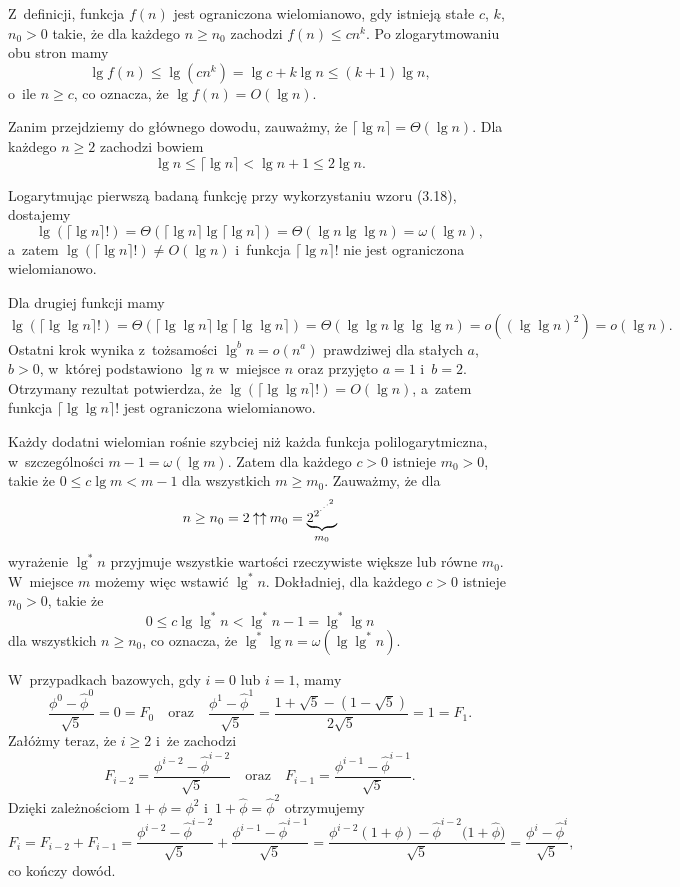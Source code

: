 \exercise %
Z~definicji, funkcja $f(n)$ jest ograniczona wielomianowo, gdy istnieją stałe $c$, $k$, $n_0>0$ takie, że dla każdego $n\ge n_0$ zachodzi $f(n)\le cn^k$.
Po zlogarytmowaniu obu stron mamy
\[
	\lg f(n) \le \lg(cn^k) = \lg c+k\lg n \le (k+1)\lg n,
\]
o~ile $n\ge c$, co oznacza, że $\lg f(n)=O(\lg n)$.

Zanim przejdziemy do głównego dowodu, zauważmy, że $\lceil\lg n\rceil=\Theta(\lg n)$.
Dla każdego $n\ge2$ zachodzi bowiem
\[
	\lg n \le \lceil\lg n\rceil < \lg n+1 \le 2\lg n.
\]

Logarytmując pierwszą badaną funkcję przy wykorzystaniu wzoru (3.18), dostajemy
\[
	\lg(\lceil\lg n\rceil!) = \Theta(\lceil\lg n\rceil\lg\lceil\lg n\rceil) = \Theta(\lg n\lg\lg n) = \omega(\lg n),
\]
a~zatem $\lg(\lceil\lg n\rceil!)\ne O(\lg n)$ i~funkcja $\lceil\lg n\rceil!$ nie jest ograniczona wielomianowo.

Dla drugiej funkcji mamy
\[
	\lg(\lceil\lg\lg n\rceil!) = \Theta(\lceil\lg\lg n\rceil\lg\lceil\lg\lg n\rceil) = \Theta(\lg\lg n\lg\lg\lg n) = o((\lg\lg n)^2) = o(\lg n).
\]
Ostatni krok wynika z~tożsamości $\lg^bn=o(n^a)$ prawdziwej dla stałych $a$, $b>0$, w~której podstawiono $\lg n$ w~miejsce $n$ oraz przyjęto $a=1$ i~$b=2$.
Otrzymany rezultat potwierdza, że $\lg(\lceil\lg\lg n\rceil!)=O(\lg n)$, a~zatem funkcja $\lceil\lg\lg n\rceil!$ jest ograniczona wielomianowo.

\exercise %
Każdy dodatni wielomian rośnie szybciej niż każda funkcja polilogarytmiczna, w~szczególności $m-1=\omega(\lg m)$.
Zatem dla każdego $c>0$ istnieje $m_0>0$, takie że $0\le c\lg m<m-1$ dla wszystkich $m\ge m_0$.
Zauważmy, że dla
\[
	\setlength{\abovedisplayskip}{2pt}
	\setlength{\belowdisplayskip}{2pt}
	n \ge n_0 = 2\mathbin{\uparrow\uparrow}m_0 = \underbrace{2^{2^{\cdot^{\cdot^{\cdot^{2}}}}}}_{m_0}
\]
wyrażenie $\lg^*n$ przyjmuje wszystkie wartości rzeczywiste większe lub równe $m_0$.
W~miejsce $m$ możemy więc wstawić $\lg^*n$.
Dokładniej, dla każdego $c>0$ istnieje $n_0>0$, takie że
\[
	0 \le c\lg\lg^*n < \lg^*n-1 = \lg^*\lg n
\]
dla wszystkich $n\ge n_0$, co oznacza, że $\lg^*\lg n=\omega(\lg\lg^*n)$.

\exercise %
W~przypadkach bazowych, gdy $i=0$ lub $i=1$, mamy
\[
	\frac{\phi^0-\widehat\phi^0}{\sqrt{5}} = 0 = F_0 \quad\text{oraz}\quad \frac{\phi^1-\widehat\phi^1}{\sqrt{5}} = \frac{1+\sqrt{5}-\left(1-\sqrt{5}\right)}{2\sqrt{5}} = 1 = F_1.
\]
Załóżmy teraz, że $i\ge2$ i~że zachodzi
\[
	F_{i-2} = \frac{\phi^{i-2}-\widehat\phi^{i-2}}{\sqrt{5}} \quad\text{oraz}\quad F_{i-1} = \frac{\phi^{i-1}-\widehat\phi^{i-1}}{\sqrt{5}}.
\]
Dzięki zależnościom $1+\phi=\phi^2$ i~$1+\widehat\phi=\widehat\phi^2$ otrzymujemy
\[
	F_i = F_{i-2}+F_{i-1} = \frac{\phi^{i-2}-\widehat\phi^{i-2}}{\sqrt{5}}+\frac{\phi^{i-1}-\widehat\phi^{i-1}}{\sqrt{5}} = \frac{\phi^{i-2}(1+\phi)-\widehat\phi^{i-2}\bigl(1+\widehat\phi\bigr)}{\sqrt{5}} = \frac{\phi^i-\widehat\phi^i}{\sqrt{5}},
\]
co kończy dowód.

